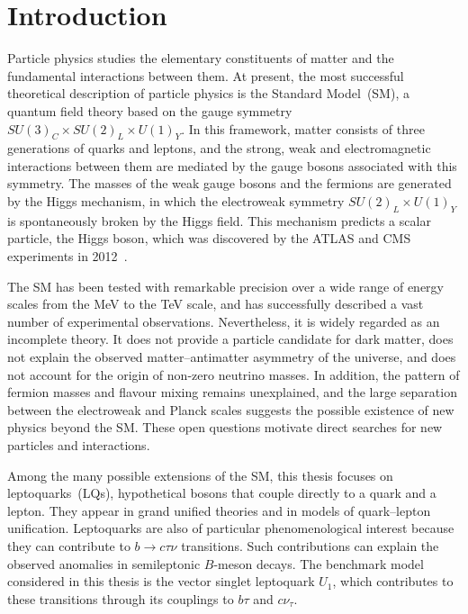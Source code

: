 \chapter{Introduction}
\label{chapter1:introduction}

Particle physics studies the elementary constituents of matter and the fundamental interactions between them.
At present, the most successful theoretical description of particle physics is the Standard Model~(SM), a quantum field theory based on the gauge symmetry $SU(3)_{C} \times SU(2)_{L} \times U(1)_{Y}$.
In this framework, matter consists of three generations of quarks and leptons, and the strong, weak and electromagnetic interactions between them are mediated by the gauge bosons associated with this symmetry.
The masses of the weak gauge bosons and the fermions are generated by the Higgs mechanism, in which the electroweak symmetry $SU(2)_{L} \times U(1)_{Y}$ is spontaneously broken by the Higgs field.
This mechanism predicts a scalar particle, the Higgs boson, which was discovered by the ATLAS and CMS experiments in 2012~\cite{ATLAS2012Higgs,CMS2012Higgs}.

The SM has been tested with remarkable precision over a wide range of energy scales from the MeV to the TeV scale, and has successfully described a vast number of experimental observations. 
Nevertheless, it is widely regarded as an incomplete theory. 
It does not provide a particle candidate for dark matter, does not explain the observed matter--antimatter asymmetry of the universe, and does not account for the origin of non-zero neutrino masses. 
In addition, the pattern of fermion masses and flavour mixing remains unexplained, and the large separation between the electroweak and Planck scales suggests the possible existence of new physics beyond the SM. 
These open questions motivate direct searches for new particles and interactions.

Among the many possible extensions of the SM, this thesis focuses on leptoquarks~(LQs), hypothetical bosons that couple directly to a quark and a lepton.
They appear in grand unified theories and in models of quark--lepton unification.
Leptoquarks are also of particular phenomenological interest because they can contribute to $b\to c\tau\nu$ transitions.
Such contributions can explain the observed anomalies in semileptonic $B$-meson decays.
The benchmark model considered in this thesis is the vector singlet leptoquark $U_{1}$, which contributes to these transitions through its couplings to $b\tau$ and $c\nu_\tau$.

